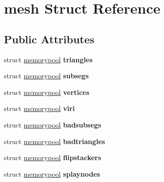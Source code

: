 \hypertarget{structmesh}{\section{mesh Struct Reference}
\label{structmesh}
}
\subsection*{Public Attributes}
\begin{DoxyCompactItemize}
\item 
\hypertarget{structmesh_a69079626a8de35998ff5ee644aeb5b5a}{struct \hyperlink{structmemorypool}{memorypool} {\bfseries triangles}}\label{structmesh_a69079626a8de35998ff5ee644aeb5b5a}

\item 
\hypertarget{structmesh_a3c29f7e745ae22b5bb4cf08d49b77895}{struct \hyperlink{structmemorypool}{memorypool} {\bfseries subsegs}}\label{structmesh_a3c29f7e745ae22b5bb4cf08d49b77895}

\item 
\hypertarget{structmesh_a9812ee57bbbb5b168d4a85403e5acbad}{struct \hyperlink{structmemorypool}{memorypool} {\bfseries vertices}}\label{structmesh_a9812ee57bbbb5b168d4a85403e5acbad}

\item 
\hypertarget{structmesh_a3cb8300dd2e6dc4e11795ac178bf02b5}{struct \hyperlink{structmemorypool}{memorypool} {\bfseries viri}}\label{structmesh_a3cb8300dd2e6dc4e11795ac178bf02b5}

\item 
\hypertarget{structmesh_aeb8da45b7822882ee7db7d1a1249a0b7}{struct \hyperlink{structmemorypool}{memorypool} {\bfseries badsubsegs}}\label{structmesh_aeb8da45b7822882ee7db7d1a1249a0b7}

\item 
\hypertarget{structmesh_a05cf8b5d0015464c86521cd8a1ddd768}{struct \hyperlink{structmemorypool}{memorypool} {\bfseries badtriangles}}\label{structmesh_a05cf8b5d0015464c86521cd8a1ddd768}

\item 
\hypertarget{structmesh_a21056ea10e510d8aaa99e93d35ef5fe2}{struct \hyperlink{structmemorypool}{memorypool} {\bfseries flipstackers}}\label{structmesh_a21056ea10e510d8aaa99e93d35ef5fe2}

\item 
\hypertarget{structmesh_a86186d96a9bac08ba51665bce57a4009}{struct \hyperlink{structmemorypool}{memorypool} {\bfseries splaynodes}}\label{structmesh_a86186d96a9bac08ba51665bce57a4009}


\end{DoxyCompactItemize}
